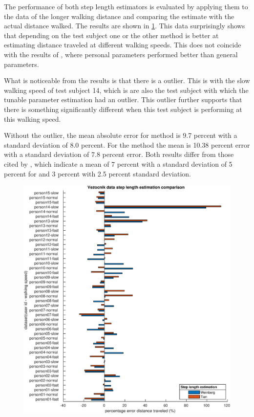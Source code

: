 The performance of both step length estimators is evaluated by applying them to the data of the longer walking distance and comparing the estimate with the actual distance walked. The results are shown in  \cref{fig:202011131943_wienberg_vs_tian_vezocnik_data1}. This data surprisingly shows that depending on the test subject one or the other method is better at estimating distance traveled at different walking speeds. This does not coincide with the results of \cite{Vezocnik2019}, where personal parameters performed better than general parameters.

What is noticeable from the results is that there is a outlier. This is with the slow walking speed of test subject 14, which is are also the test subject with which the tunable parameter estimation had an outlier. This outlier further supports that there is something significantly different when this test subject is performing at this walking speed.\par 

 Without the outlier, the mean absolute error for \citet{Tian2016} method is 9.7 percent with a standard deviation of 8.0 percent. For the \citet{weinberg} method the mean is 10.38 percent error with a standard deviation of 7.8 percent error. Both results differ from those cited by \cite{Vezocnik2019}, which indicate a mean of 7 percent with a standard deviation of 5 percent for \citet{Tian2016} and 3 percent with 2.5 percent standard deviation.

\par

\begin{figure}[H]
	\centering
	\includegraphics[width=\linewidth]{images/20201113_1943_wienberg_vs_tian_vezocnik_data_1}
	\caption{}
	\label{fig:202011131943_wienberg_vs_tian_vezocnik_data1}
\end{figure}
 
